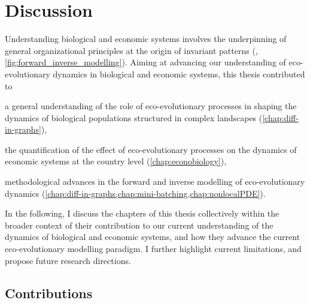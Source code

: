 
\graphicspath{{./content/conclusion/fig/}}

\chapter{Discussion}
\label{sec:conclusion}



Understanding biological and economic systems involves the underpinning of general organizational principles at the origin of invariant patterns (\cite{Levin2002}, \cref{fig:forward_inverse_modelling}).
% 
Aiming at advancing our understanding of eco-evolutionary dynamics in biological and economic systems, this thesis contributed to
% 
\begin{mylisti}
    \item a general understanding of the role of eco-evolutionary processes in shaping the dynamics of biological populations structured in complex landscapes (\cref{chap:diff-in-graphs}),
    \item the quantification of the effect of eco-evolutionary processes on the dynamics of economic systems at the country level (\cref{chap:econobiology}),
    \item methodological advances in the forward and inverse modelling of eco-evolutionary dynamics (\cref{chap:diff-in-graphs,chap:mini-batching,chap:nonlocalPDE}).
\end{mylisti}
% 
In the following, I discuss the chapters of this thesis collectively within the broader context of their contribution to our current understanding of the dynamics of biological and economic systems, and how they advance the current eco-evolutionary modelling paradigm. I further highlight current limitations, and propose future research directions.

\section{Contributions}


